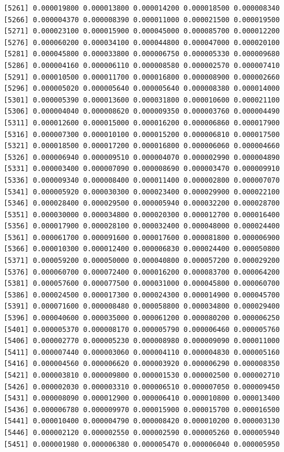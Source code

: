 \documentclass[]{article}
\begin{document}
\begin{verbatim}
 [5261] 0.000019800 0.000013800 0.000014200 0.000018500 0.000008340
 [5266] 0.000004370 0.000008390 0.000011000 0.000021500 0.000019500
 [5271] 0.000023100 0.000015900 0.000045000 0.000085700 0.000012200
 [5276] 0.000060200 0.000034100 0.000044800 0.000047000 0.000020100
 [5281] 0.000045800 0.000033800 0.000006750 0.000005330 0.000009680
 [5286] 0.000004160 0.000006110 0.000008580 0.000002570 0.000007410
 [5291] 0.000010500 0.000011700 0.000016800 0.000008900 0.000002660
 [5296] 0.000005020 0.000005640 0.000005640 0.000008380 0.000014000
 [5301] 0.000005390 0.000013600 0.000031800 0.000010600 0.000021100
 [5306] 0.000004040 0.000008620 0.000009350 0.000003760 0.000004490
 [5311] 0.000012600 0.000015000 0.000016200 0.000006860 0.000017900
 [5316] 0.000007300 0.000010100 0.000015200 0.000006810 0.000017500
 [5321] 0.000018500 0.000017200 0.000016800 0.000006060 0.000004660
 [5326] 0.000006940 0.000009510 0.000004070 0.000002990 0.000004890
 [5331] 0.000003400 0.000007090 0.000008690 0.000003470 0.000009910
 [5336] 0.000009340 0.000008400 0.000011400 0.000002800 0.000007070
 [5341] 0.000005920 0.000030300 0.000023400 0.000029900 0.000022100
 [5346] 0.000028400 0.000029500 0.000005940 0.000032200 0.000028700
 [5351] 0.000030000 0.000034800 0.000020300 0.000012700 0.000016400
 [5356] 0.000017900 0.000028100 0.000032400 0.000048000 0.000024400
 [5361] 0.000061700 0.000091600 0.000017600 0.000081800 0.000006900
 [5366] 0.000010300 0.000012400 0.000006830 0.000024400 0.000050800
 [5371] 0.000059200 0.000050000 0.000040800 0.000057200 0.000029200
 [5376] 0.000060700 0.000072400 0.000016200 0.000083700 0.000064200
 [5381] 0.000057600 0.000077500 0.000031000 0.000045800 0.000060700
 [5386] 0.000024500 0.000017300 0.000024300 0.000014900 0.000045700
 [5391] 0.000071600 0.000008480 0.000058800 0.000034800 0.000029400
 [5396] 0.000040600 0.000035000 0.000061200 0.000080200 0.000006250
 [5401] 0.000005370 0.000008170 0.000005790 0.000006460 0.000005760
 [5406] 0.000002770 0.000005230 0.000008980 0.000009090 0.000011000
 [5411] 0.000007440 0.000003060 0.000004110 0.000004830 0.000005160
 [5416] 0.000004560 0.000006620 0.000003920 0.000006290 0.000008350
 [5421] 0.000003810 0.000009800 0.000001530 0.000002500 0.000002710
 [5426] 0.000002030 0.000003310 0.000006510 0.000007050 0.000009450
 [5431] 0.000008090 0.000012900 0.000006410 0.000010800 0.000013400
 [5436] 0.000006780 0.000009970 0.000015900 0.000015700 0.000016500
 [5441] 0.000010400 0.000004790 0.000008420 0.000010200 0.000003130
 [5446] 0.000002120 0.000002550 0.000002590 0.000005260 0.000005940
 [5451] 0.000001980 0.000006380 0.000005470 0.000006040 0.000005950

\end{verbatim}
\end{document}
